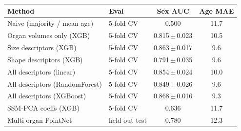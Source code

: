 \begin{tabular}{llcc}
\toprule
Method & Eval & Sex AUC & Age MAE \\
\midrule
Naive (majority / mean age) & 5-fold CV & 0.500 & 11.7 \\
Organ volumes only (XGB) & 5-fold CV & 0.815\,$\pm$\,0.023 & 10.5 \\
Size descriptors (XGB) & 5-fold CV & 0.863\,$\pm$\,0.017 & 9.6 \\
Shape descriptors (XGB) & 5-fold CV & 0.791\,$\pm$\,0.035 & 9.6 \\
All descriptors (linear) & 5-fold CV & 0.854\,$\pm$\,0.024 & 10.0 \\
All descriptors (RandomForest) & 5-fold CV & 0.849\,$\pm$\,0.026 & 9.6 \\
All descriptors (XGBoost) & 5-fold CV & 0.868\,$\pm$\,0.016 & 9.3 \\
SSM-PCA coeffs (XGB) & 5-fold CV & 0.636 & 11.7 \\
Multi-organ PointNet & held-out test & 0.780 & 12.3 \\
\bottomrule
\end{tabular}
